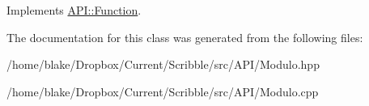 Implements \hyperlink{class_a_p_i_1_1_function_ae56761ad4c849c05e12cb4cd02583c77}{A\-P\-I\-::\-Function}.



The documentation for this class was generated from the following files\-:\begin{DoxyCompactItemize}
\item 
/home/blake/\-Dropbox/\-Current/\-Scribble/src/\-A\-P\-I/Modulo.\-hpp\item 
/home/blake/\-Dropbox/\-Current/\-Scribble/src/\-A\-P\-I/Modulo.\-cpp\end{DoxyCompactItemize}
